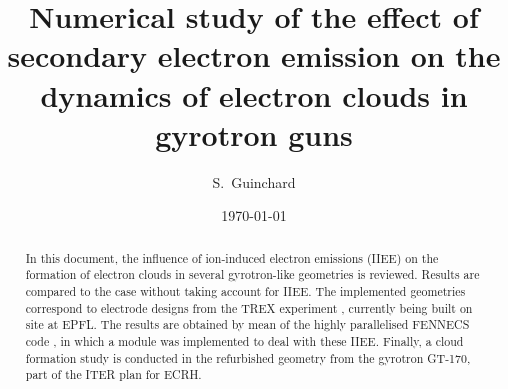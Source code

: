 \documentclass[aps,prc,floatfix,showkeys,nofootinbib]{revtex4-1}
\begin{document}
\title{Numerical study of the effect of secondary electron emission on the dynamics of electron clouds in gyrotron guns }

\author{S.~Guinchard} 


\date{\today}

\begin{abstract}
In this document, the influence of ion-induced electron emissions (IIEE) on the formation of electron clouds in several gyrotron-like geometries is reviewed. Results are compared to the case without taking account for IIEE. The implemented geometries correspond to electrode designs from the TREX experiment \cite{TREX},  currently being built on site at EPFL. The results are obtained by mean of the highly parallelised FENNECS code \cite{fennecs}, in which a module was implemented to deal with these IIEE. Finally, a cloud formation study is conducted in the refurbished geometry from the gyrotron GT-170, part of the ITER plan for ECRH. 
\end{abstract}

{
\let\clearpage\relax
\maketitle
\sloppy
}




\newpage










\newpage


\end{document}
